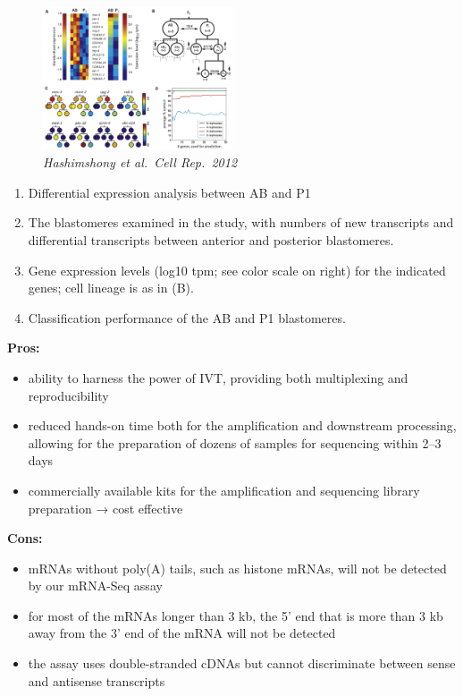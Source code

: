 \begin{figure}
\centering
\includegraphics[width=0.5\textwidth]{images/Screen_Shot_2023-02-20_at_19-30-17.png}
\caption{\emph{Hashimshony et al.~Cell Rep.~2012}}
\end{figure}

\begin{enumerate}
\def\labelenumi{(\Alph{enumi})}
\tightlist
\item
  Differential expression analysis between AB and P1
\item
  The blastomeres examined in the study, with numbers of new transcripts
  and differential transcripts between anterior and posterior
  blastomeres.
\item
  Gene expression levels (log10 tpm; see color scale on right) for the
  indicated genes; cell lineage is as in (B).
\item
  Classification performance of the AB and P1 blastomeres.
\end{enumerate}


\textbf{Pros:}

\begin{itemize}
\tightlist
\item
  ability to harness the power of IVT, providing both multiplexing and
  reproducibility
\item
  reduced hands-on time both for the amplification and downstream
  processing, allowing for the preparation of dozens of samples for
  sequencing within 2--3 days
\item
  commercially available kits for the amplification and sequencing
  library preparation → cost effective
\end{itemize}

\textbf{Cons:}

\begin{itemize}
\tightlist
\item
  mRNAs without poly(A) tails, such as histone mRNAs, will not be
  detected by our mRNA-Seq assay
\item
  for most of the mRNAs longer than 3 kb, the 5' end that is more than 3
  kb away from the 3' end of the mRNA will not be detected
\item
  the assay uses double-stranded cDNAs but cannot discriminate between
  sense and antisense transcripts
\end{itemize}

